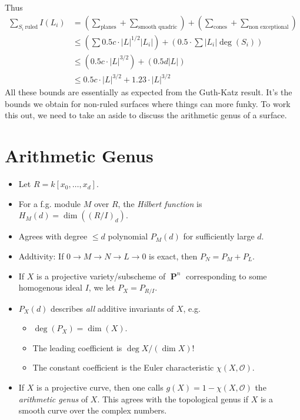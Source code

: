 \documentclass{article}
\theoremstyle{plain}
\theoremstyle{remark}
\theoremstyle{definition}
\DeclareMathOperator{\PP}{\mathbf{P}}
\begin{document}
Thus
%
\begin{align*}
    \sum_{S_i\ \text{ruled}} I(L_i) &= \left( \sum_{\text{planes}} + \sum_{\text{smooth quadric}} \right) + \left( \sum_{\text{cones}} + \sum_{\text{non exceptional}} \right)\\
    &\leq \left( \sum 0.5c \cdot |L|^{1/2} |L_i| \right) + \left( 0.5 \cdot \sum |L_i| \deg(S_i) \right)\\
    &\leq \left( 0.5c \cdot |L|^{3/2} \right) + \left( 0.5 d |L| \right)\\
    &\leq 0.5c \cdot |L|^{3/2} + 1.23 \cdot |L|^{3/2}
\end{align*}
%
All these bounds are essentially as expected from the Guth-Katz result. It's the bounds we obtain for non-ruled surfaces where things can more funky. To work this out, we need to take an aside to discuss the arithmetic genus of a surface.

\section{Arithmetic Genus}

\begin{itemize}
    \item Let $R = k[x_0, \dots, x_d]$.

    \item For a f.g. module $M$ over $R$, the {\it Hilbert function} is $H_M(d) = \dim((R/I)_d)$.

    \item Agrees with degree $\leq d$ polynomial $P_M(d)$ for sufficiently large $d$.

    \item Addtivity: If $0 \to M \to N \to L \to 0$ is exact, then $P_N = P_M + P_L$.

    \item If $X$ is a projective variety/subscheme of $\PP^n$ corresponding to some homogenous ideal $I$, we let $P_X = P_{R/I}$.

    \item $P_X(d)$ describes {\it all} additive invariants of $X$, e.g.
    \begin{itemize}
        \item $\deg(P_X) = \dim(X)$.
        \item The leading coefficient is $\deg X / (\dim X)!$
        \item The constant coefficient is the Euler characteristic $\chi(X,\mathcal{O})$.
    \end{itemize}

    \item If $X$ is a projective curve, then one calls $g(X) = 1 - \chi(X,\mathcal{O})$ the {\it arithmetic genus} of $X$. This agrees with the topological genus if $X$ is a smooth curve over the complex numbers.
\end{itemize}
\end{document}
